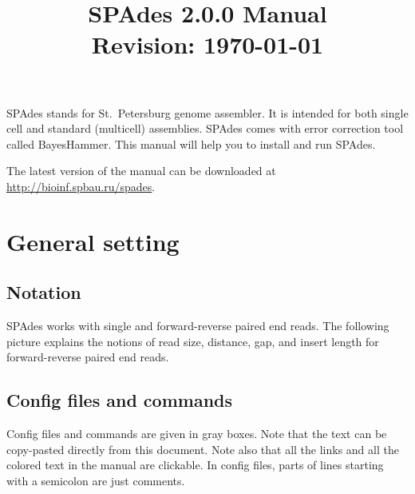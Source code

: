 \documentclass{article}
\def\spades{SPAdes}
\begin{document}
\title{{\spades} 2.0.0 Manual\\{\small 
  Revision: \today}}
\date{}
\maketitle

{\spades} stands for St.~Petersburg genome assembler.
It is intended for both single cell and standard (multicell) 
assemblies. {\spades} comes with error correction tool called 
BayesHammer. This manual will help you to install and run
{\spades}.

The latest version of the manual can be downloaded at \url{http://bioinf.spbau.ru/spades}.


\renewcommand{\contentsname}{}
\tableofcontents



\pagebreak

\section{General setting}
\subsection{Notation}
{\spades} works with single and forward-reverse paired end reads.
The following picture explains the notions of 
read size, distance, gap, and insert length
for forward-reverse paired end reads.

\begin{center}
\end{center}

\subsection{Config files and commands}
Config files and commands are given in gray boxes. 
Note that the text can be copy-pasted directly from this document.
Note also that all the links and all the colored text in the manual are clickable.
In config files, parts of lines starting with a semicolon are just comments.
\end{document}

